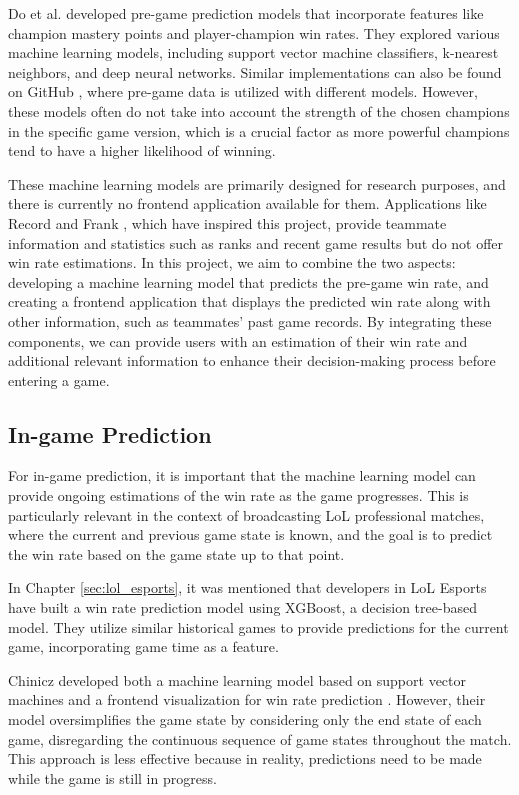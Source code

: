 \documentclass[11pt,a4paper,oneside]{report}
\begin{document}
Do et al. \cite{do-wang-yu-mc-millian-mc-mahan-2021} developed pre-game prediction models that incorporate features like champion mastery points and player-champion win rates. They explored various machine learning models, including support vector machine classifiers, k-nearest neighbors, and deep neural networks. Similar implementations can also be found on GitHub \cite{reneleogp}, where pre-game data is utilized with different models. However, these models often do not take into account the strength of the chosen champions in the specific game version, which is a crucial factor as more powerful champions tend to have a higher likelihood of winning.

These machine learning models are primarily designed for research purposes, and there is currently no frontend application available for them. Applications like Record \cite{record} and Frank \cite{frank}, which have inspired this project, provide teammate information and statistics such as ranks and recent game results but do not offer win rate estimations. In this project, we aim to combine the two aspects: developing a machine learning model that predicts the pre-game win rate, and creating a frontend application that displays the predicted win rate along with other information, such as teammates' past game records. By integrating these components, we can provide users with an estimation of their win rate and additional relevant information to enhance their decision-making process before entering a game.

\subsection{In-game Prediction}

For in-game prediction, it is important that the machine learning model can provide ongoing estimations of the win rate as the game progresses. This is particularly relevant in the context of broadcasting LoL professional matches, where the current and previous game state is known, and the goal is to predict the win rate based on the game state up to that point.

In Chapter \ref{sec:lol_esports}, it was mentioned that developers in LoL Esports have built a win rate prediction model using XGBoost, a decision tree-based model. They utilize similar historical games to provide predictions for the current game, incorporating game time as a feature.

Chinicz developed both a machine learning model based on support vector machines and a frontend visualization for win rate prediction \cite{chinicz-2023}. However, their model oversimplifies the game state by considering only the end state of each game, disregarding the continuous sequence of game states throughout the match. This approach is less effective because in reality, predictions need to be made while the game is still in progress.
\end{document}
